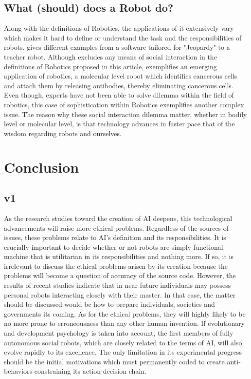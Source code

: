 \documentclass[man]{apa6}
\begin{document}
\subsection{What (should) does a Robot do?}
Along with the definitions of Robotics, the applications of it extensively vary which makes it hard to define or understand the task and the responsibilities of robots.  gives different examples from a software tailored for "Jeopardy" to a teacher robot.
Although  excludes any means of social interaction in the definitions of Robotics proposed in this article,  exemplifies an emerging application of robotics, a molecular level robot which identifies cancerous cells and attach them by releasing antibodies, thereby eliminating cancerous cells. Even though, experts have not been able to solve dilemma within the field of robotics, this case of sophistication within Robotics exemplifies another complex issue.
The reason why these social interaction dilemma matter, whether in bodily level or molecular level, is that technology advances in faster pace that of the wisdom regarding robots and ourselves.\par

\section{Conclusion}
\subsection{v1}
As the research studies toward the creation of AI deepens, this technological advancements will raise more ethical problems. Regardless of the sources of issues, these problems relate to AI's definition and its responsibilities. It is crucially important to decide whether or not robots are simply functional machine that is utilitarian in its responsibilities and nothing more. If so, it is irrelevant to discuss the ethical problems arisen by its creation because the problems will become a question of accuracy of the source code. However, the results of recent studies indicate that in near future individuals may possess personal robots interacting closely with their master. In that case, the matter should be discussed would be how to prepare individuals, societies and governments its coming. As for the ethical problems, they will highly likely to be no more prone to erroneousness than any other human invention. If evolutionary and development psychology is taken into account, the first members of fully autonomous social robots, which are closely related to the terms of AI, will also evolve rapidly to its excellence. The only limitation in its experimental progress should be the initial motivations which must permanently coded to create anti-behaviors constraining its action-decision chain.
\end{document}
